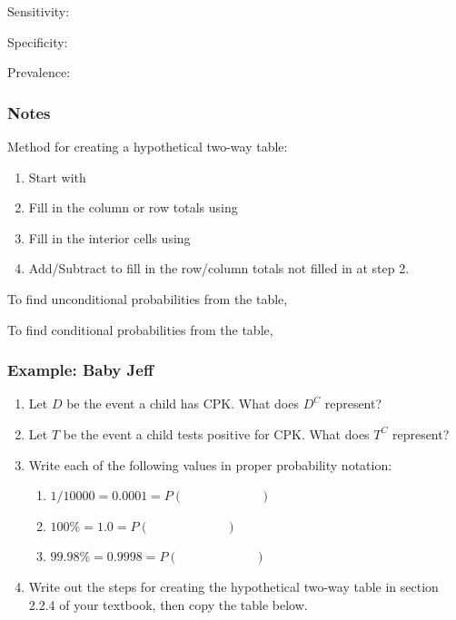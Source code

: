 \documentclass[
]{report}
\providecommand{\tightlist}{%
  \setlength{\itemsep}{0pt}\setlength{\parskip}{0pt}}
\newcommand{\rgs}{\vspace{12pt}} %
\newcommand{\rgi}{\hspace{24pt}}  %
\begin{document}
Sensitivity:
\rgs

Specificity:
\rgs

Prevalence:
\rgs

\hypertarget{notes-24}{%
\subsubsection*{Notes}\label{notes-24}}

Method for creating a hypothetical two-way table:

\begin{enumerate}
\def\labelenumi{\arabic{enumi}.}
\item
  Start with
  \rgs
\item
  Fill in the column or row totals using
  \rgs
\item
  Fill in the interior cells using
  \rgs
\item
  Add/Subtract to fill in the row/column totals not filled in at step 2.
\end{enumerate}

\rgi \rgi To find unconditional probabilities from the table,
\rgs

\rgi \rgi To find conditional probabilities from the table,
\rgs

\hypertarget{example-baby-jeff}{%
\subsubsection*{Example: Baby Jeff}\label{example-baby-jeff}}

\begin{enumerate}
\def\labelenumi{\arabic{enumi}.}
\item
  Let \(D\) be the event a child has CPK. What does \(D^C\) represent?
  \rgs
\item
  Let \(T\) be the event a child tests positive for CPK. What does \(T^C\) represent?
  \rgs
\item
  Write each of the following values in proper probability notation:

  \begin{enumerate}
  \def\labelenumii{\alph{enumii}.}
  \tightlist
  \item
    \(1/10000 = 0.0001 = P( \hspace{1in} )\)
  \item
    \(100\% = 1.0 = P( \hspace{1in} )\)
  \item
    \(99.98\% = 0.9998 = P( \hspace{1in} )\)
  \end{enumerate}
\item
  Write out the steps for creating the hypothetical two-way table in section 2.2.4 of your textbook, then copy the table below.
\end{enumerate}
\end{document}
